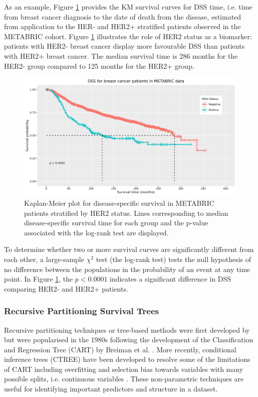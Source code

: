 As an example, Figure \ref{fig:SurvivalCurves} provides the KM survival curves for DSS time, i.e. time from breast cancer diagnosis to the date of death from the disease, estimated from application to the HER- and HER2+ stratified patients observed in the METABRIC cohort. Figure \ref{fig:SurvivalCurves} illustrates the role of HER2 status as a biomarker: patients with HER2- breast cancer display more favourable DSS than patients with HER2+ breast cancer. The median survival time is 286 months for the HER2- group compared to 125 months for the HER2+ group. 

\vfill 
\begin{figure}[!h]
\includegraphics[width=1\textwidth]{../figures/Chapter_3/Example_Survival_Curve.png}
\caption[Kaplan-Meier plot for disease-specific survival in METABRIC patients stratified by HER2 status.]{Kaplan-Meier plot for disease-specific survival in METABRIC patients stratified by HER2 status. Lines corresponding to median disease-specific survival time for each group and the p-value associated with the log-rank test are displayed.}
\label{fig:SurvivalCurves}
\end{figure}
\vfill
\clearpage 

To determine whether two or more survival curves are significantly different from each other, a large-sample $\chi^2$ test (the log-rank test) tests the null hypothesis of no difference between the populations in the probability of an event at any time point. In Figure \ref{fig:SurvivalCurves}, the $p<0.0001$ indicates a significant difference in DSS comparing HER2- and HER2+ patients. 

\subsubsection{Recursive Partitioning Survival Trees}
Recursive partitioning techniques or tree-based methods were first developed by \cite{Morgan_Sonquist_1963} but were popularised in the 1980s following the development of the Classification and Regression Tree (CART) by Breiman et al. \citep{breiman_1984, bb_2011}. More recently, conditional inference trees (CTREE) have been developed to resolve some of the limitations of CART including overfitting and selection bias towards variables with many possible splits, i.e. continuous variables \citep{hothorn_hornik_zeileis_2006}. These non-parametric techniques are useful for identifying important predictors and structure in a dataset.  


